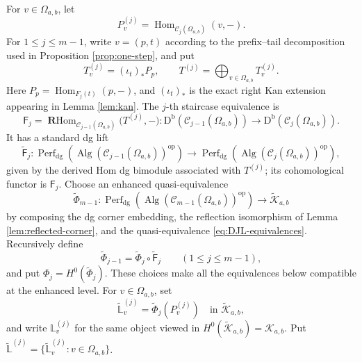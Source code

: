 \documentclass[12pt,a4paper,english,reqno]{amsart}
\theoremstyle{plain}
\theoremstyle{definition}
\newcommand{\Db}{\mathrm D^{\mathrm b}}
\newcommand{\Hom}{\operatorname{Hom}}
\newcommand{\RHom}{\operatorname{\mathbf{R}Hom}}
\newcommand{\op}{\mathrm{op}}
\newcommand{\C}{\mathcal C}
\begin{document}
For $v\in\Omega_{a,b}$, let
\begin{equation}
 P_v^{(j)}
 =
 \Hom_{\C_j(\Omega_{a,b})}(v,-).
\label{eq:staircase-projective-j}
\end{equation}
For $1\leq j\leq m-1$, write $v=(p,t)$ according to the prefix--tail
decomposition used in Proposition \ref{prop:one-step}, and put
\begin{equation}
 T_v^{(j)}
 =
 (\iota_t)_*P_p,
 \qquad
 T^{(j)}
 =
 \bigoplus_{v\in\Omega_{a,b}}T_v^{(j)}.
\label{eq:staircase-tilting-j}
\end{equation}
Here $P_p=\Hom_{F_j(t)}(p,-)$, and $(\iota_t)_*$ is the exact right
Kan extension appearing in Lemma \ref{lem:kan}.  The $j$-th staircase
equivalence is
\begin{equation}
 \mathsf F_j
 =
 \RHom_{\C_{j-1}(\Omega_{a,b})}
 \bigl(T^{(j)},-\bigr)
 \colon
 \Db(\C_{j-1}(\Omega_{a,b}))
 \longrightarrow
 \Db(\C_j(\Omega_{a,b})).
\label{eq:staircase-step-functor}
\end{equation}
It has a standard dg lift
\begin{equation}
 \widetilde{\mathsf F}_j\colon
 \operatorname{Perf}_{\mathrm{dg}}
 \!\left(\operatorname{Alg}(\C_{j-1}(\Omega_{a,b}))^{\op}\right)
 \longrightarrow
 \operatorname{Perf}_{\mathrm{dg}}
 \!\left(\operatorname{Alg}(\C_j(\Omega_{a,b}))^{\op}\right),
\label{eq:enhanced-staircase-step}
\end{equation}
given by the derived Hom dg bimodule associated with $T^{(j)}$; its
cohomological functor is $\mathsf F_j$.  Choose an enhanced
quasi-equivalence
\begin{equation}
 \widetilde\Phi_{m-1}\colon
 \operatorname{Perf}_{\mathrm{dg}}
 \!\left(\operatorname{Alg}(\C_{m-1}(\Omega_{a,b}))^{\op}\right)
 \longrightarrow\widetilde{\mathcal K}_{a,b}
\label{eq:enhanced-final-Phi}
\end{equation}
by composing the dg corner embedding, the reflection isomorphism of
Lemma \ref{lem:reflected-corner}, and the quasi-equivalence
\eqref{eq:DJL-equivalences}.  Recursively define
\begin{equation}
 \widetilde\Phi_{j-1}
 =\widetilde\Phi_j\circ\widetilde{\mathsf F}_j
 \qquad(1\leq j\leq m-1),
\label{eq:enhanced-Phi-recursion}
\end{equation}
and put $\Phi_j=H^0(\widetilde\Phi_j)$.  These choices make all the
equivalences below compatible at the enhanced level.
For $v\in\Omega_{a,b}$, set
\begin{equation}
 \widetilde{\mathbb L}_v^{(j)}
 =\widetilde\Phi_j(P_v^{(j)})
 \quad\text{in }\widetilde{\mathcal K}_{a,b},
\label{eq:enhanced-L-j-definition}
\end{equation}
and write $\mathbb L_v^{(j)}$ for the same object viewed in
$H^0(\widetilde{\mathcal K}_{a,b})=\mathcal K_{a,b}$.  Put
$\widetilde{\mathbb L}^{(j)}=
\{\widetilde{\mathbb L}_v^{(j)}:v\in\Omega_{a,b}\}$.
\end{document}
